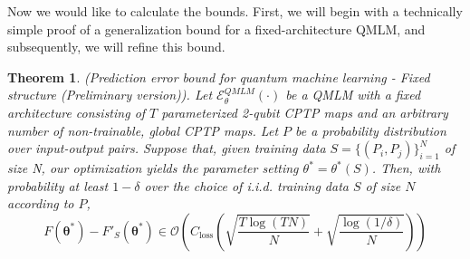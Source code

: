 \documentclass[%
 reprint,
superscriptaddress,
 amsmath,amssymb,
 aps,
]{revtex4-2}
\newcommand{\E}{\mathcal{E}}
\newtheorem{theorem}{Theorem}[section]
\begin{document}
Now we would like to calculate the bounds. First, we will begin with a technically simple proof of a generalization bound for a fixed-architecture QMLM, and subsequently, we will refine this bound.

\begin{theorem}
    (Prediction error bound for quantum machine learning - Fixed structure (Preliminary version)). Let $\E^{QMLM}_\theta(\cdot)$ be a QMLM with a fixed architecture consisting of $T$ parameterized 2-qubit CPTP maps and an arbitrary number of non-trainable, global CPTP maps. Let $P$ be a probability distribution over input-output pairs. Suppose that, given training data $S = \{(P_i, P_j)\}_{i=1}^N$ of size N, our optimization yields the parameter setting $\theta^* = \theta^*(S)$. Then, with probability at least $ 1-\delta$ over the choice of i.i.d. training data $S$ of size $N$ according to $P$,
    \begin{equation}
        F\left(\boldsymbol{\theta}^*\right)-F'_S\left(\boldsymbol{\theta}^*\right) \in \mathcal{O}\left(C_{\operatorname{loss}}\left(\sqrt{\frac{T \log (T N)}{N}}+\sqrt{\frac{\log (1 / \delta)}{N}}\right)\right)
    \end{equation}
\end{theorem}
\end{document}
